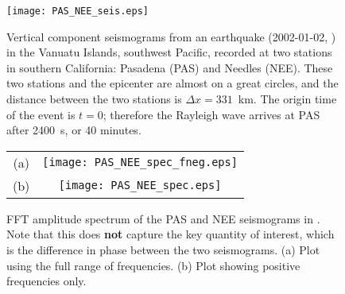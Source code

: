 \documentclass[11pt,titlepage,fleqn]{article}
\begin{document}


\begin{figure}[h]
\centering
\texttt{[image: PAS\_NEE\_seis.eps]}
\caption[]
{{
Vertical component seismograms from an earthquake (2002-01-02, ) in the Vanuatu Islands, southwest Pacific, recorded at two stations in southern California: Pasadena (PAS) and Needles (NEE). These two stations and the epicenter are almost on a great circles, and the distance between the two stations is $\Delta x = 331$~km. The origin time of the event is $t = 0$; therefore the Rayleigh wave arrives at PAS after 2400~s, or 40 minutes.
\label{fig:seis}
}}
\end{figure}



\begin{figure}[h]
\centering
\begin{tabular}{cc}
(a) & \texttt{[image: PAS\_NEE\_spec\_fneg.eps]} \\
(b) & \texttt{[image: PAS\_NEE\_spec.eps]}
\end{tabular}
\caption[]
{{
FFT amplitude spectrum of the PAS and NEE seismograms in .
Note that this does {\bf not} capture the key quantity of interest, which is the difference in phase between the two seismograms.
(a) Plot using the full range of frequencies.
(b) Plot showing positive frequencies only.
\label{fig:spec}
}}
\end{figure}

\end{document}

